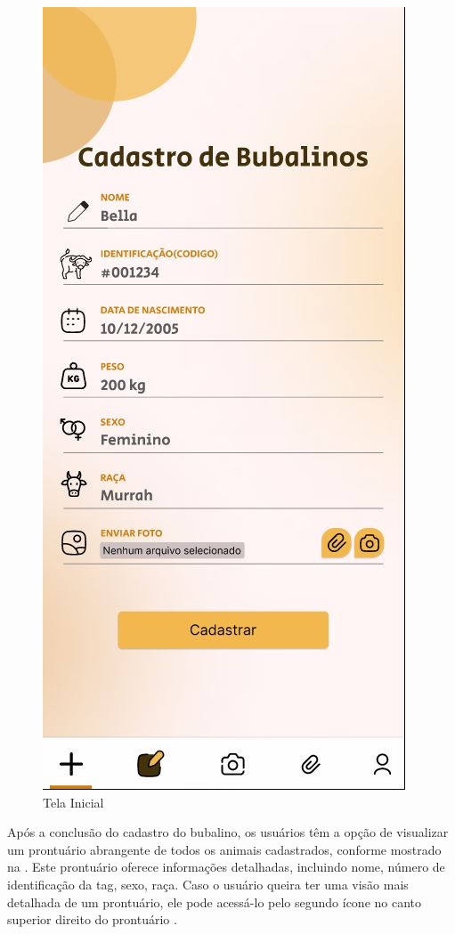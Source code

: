 \newpage
\begin{figure}[!h]
\centering
\caption{Tela Inicial}%
\label{fig:ux-mobile01}
\includegraphics[scale=0.5]{Illustrations/UX-Mobile/Mobi-02.JPG}
\end{figure}

Após a conclusão do cadastro do bubalino, os usuários têm a opção de visualizar um prontuário abrangente de todos os animais cadastrados, conforme mostrado na . Este prontuário oferece informações detalhadas, incluindo nome, número de identificação da tag, sexo, raça. Caso o usuário queira ter uma visão mais detalhada de um prontuário, ele pode acessá-lo pelo segundo ícone no canto superior direito do prontuário .

